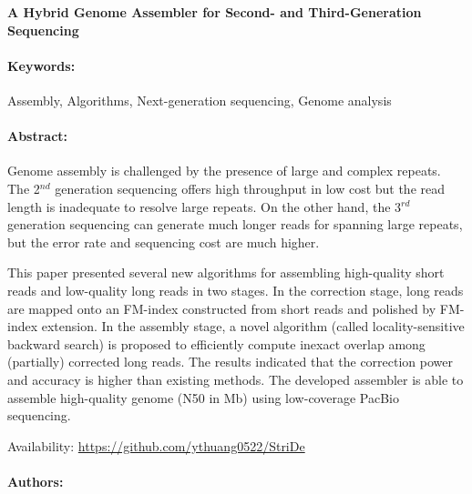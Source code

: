 \noindent
\large {\bf A Hybrid Genome Assembler for Second- and Third-Generation Sequencing} 


\normalsize 


\noindent \paragraph{Keywords:} Assembly, Algorithms, Next-generation sequencing, Genome analysis

\noindent \paragraph{Abstract:} 

Genome assembly is challenged by the presence of large and complex repeats. The 2$^{nd}$
generation sequencing offers high throughput in low cost but the read length is inadequate to resolve 
large repeats. On the other hand, the 3$^{rd}$ generation sequencing can generate much longer reads for
spanning large repeats, but the error rate and sequencing cost are much higher.

This paper presented several new algorithms for assembling high-quality short reads and
low-quality long reads in two stages. In the correction stage, long reads are mapped onto an FM-index
 constructed from short reads and polished by FM-index extension. In the assembly stage, a
novel algorithm (called locality-sensitive backward search) is proposed to efficiently compute inexact
overlap among (partially) corrected long reads. The results indicated that the correction power and
accuracy is higher than existing methods. The developed assembler is able to assemble high-quality
genome (N50 in Mb) using low-coverage PacBio sequencing.

Availability: \url{https://github.com/ythuang0522/StriDe}


\noindent \paragraph{Authors:} 

\noindent \paragraph{} 

{
\centering
{}
}
